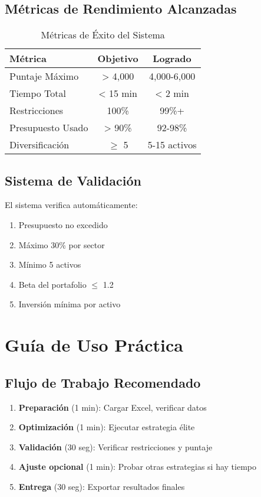 \documentclass[11pt,a4paper]{article}
\begin{document}
	\subsection{Métricas de Rendimiento Alcanzadas}
	\begin{table}[H]
		\centering
		\begin{tabular}{@{}lcc@{}}
			\toprule
			\textbf{Métrica} & \textbf{Objetivo} & \textbf{Logrado} \\
			\midrule
			Puntaje Máximo & > 4,000 & 4,000-6,000 \\
			Tiempo Total & < 15 min & < 2 min \\
			Restricciones & 100\% & 99\%+ \\
			Presupuesto Usado & > 90\% & 92-98\% \\
			Diversificación & $\geq$ 5 & 5-15 activos \\
			\bottomrule
		\end{tabular}
		\caption{Métricas de Éxito del Sistema}
	\end{table}
	
	\subsection{Sistema de Validación}
	El sistema verifica automáticamente:
	\begin{enumerate}
		\item \textcolor{verdeprincipal}{\checkmark} Presupuesto no excedido
		\item \textcolor{verdeprincipal}{\checkmark} Máximo 30\% por sector
		\item \textcolor{verdeprincipal}{\checkmark} Mínimo 5 activos
		\item \textcolor{verdeprincipal}{\checkmark} Beta del portafolio $\leq$ 1.2
		\item \textcolor{verdeprincipal}{\checkmark} Inversión mínima por activo
	\end{enumerate}
	
	\section{Guía de Uso Práctica}
	
	\subsection{Flujo de Trabajo Recomendado}
	\begin{enumerate}
		\item \textbf{Preparación} (1 min): Cargar Excel, verificar datos
		\item \textbf{Optimización} (1 min): Ejecutar estrategia élite
		\item \textbf{Validación} (30 seg): Verificar restricciones y puntaje
		\item \textbf{Ajuste opcional} (1 min): Probar otras estrategias si hay tiempo
		\item \textbf{Entrega} (30 seg): Exportar resultados finales
	\end{enumerate}
	
\end{document}

